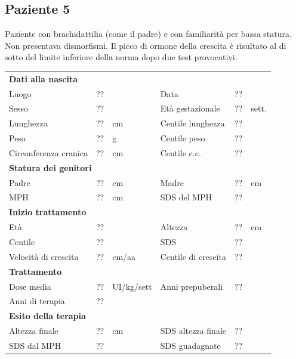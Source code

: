 \subsection*{Paziente 5}%

Paziente con brachidattilia (come il padre) e con familiarità per bassa statura. Non presentava dismorfismi. Il picco di ormone della crescita è risultato al di sotto del limite inferiore della norma dopo due test provocativi.

\begin{table}[!h]
\begin{tabular}{lrllrl}
\toprule
\multicolumn{6}{l}{\textbf{Dati alla nascita}}\\
Luogo 		& \multicolumn{2}{l}{??} 	& Data 					& \multicolumn{2}{l}{??} 	\\
Sesso 		& \multicolumn{2}{l}{??} 	& Età gestazionale 		& ?? 		& sett.\\
Lunghezza 	& ?? 		& cm 				& Centile lunghezza		& ?? 		\\
Peso 		& ?? 		& g					& Centile peso			& ?? 		\\
Circonferenza cranica	& ?? 		& cm 	& Centile c.c.			& ?? \\
\midrule
\multicolumn{6}{l}{\textbf{Statura dei genitori}}\\
Padre 		& ?? & cm 	& Madre 				& ?? & cm \\
MPH 		& ?? & cm 	& SDS del MPH 			& ??\\
\midrule
\multicolumn{6}{l}{\textbf{Inizio trattamento}} \\
Età	& ?? & 		& Altezza 				& ?? & cm  \\
Centile & ?? 	 &		& SDS		& ?? \\
Velocità di crescita & ?? & cm/aa	& Centile di crescita & ??\\
\midrule
\multicolumn{6}{l}{\textbf{Trattamento}} \\
Dose media		& ?? & UI/kg/sett & Anni prepuberali & ??\\
Anni di terapia & ??\\
\midrule
\multicolumn{6}{l}{\textbf{Esito della terapia}} \\
Altezza finale			& ?? & cm 	& SDS altezza finale		& ??\\
SDS dal MPH				& ?? &		& SDS guadagnate 			& ??\\
\bottomrule
\end{tabular}
\end{table}
\clearpage

